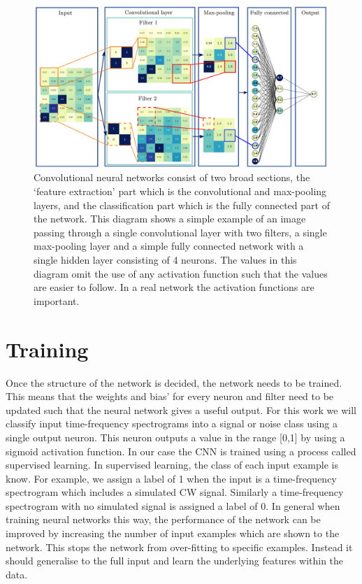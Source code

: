\begin{figure}
	\includegraphics[width=\textwidth]{C4_cnn/cnn_structure_ex.pdf}
	\caption[Structure of \glspl{CNN}.]{Convolutional neural networks consist of two broad sections, the `feature extraction' part which is the convolutional and max-pooling layers, and the classification part which is the fully connected part of the network. This diagram shows a simple example of an image passing through a single convolutional layer with two filters, a single max-pooling layer and a simple fully connected network with a single hidden layer consisting of 4 neurons. The values in this diagram omit the use of any activation function such that the values are easier to follow. In a real network the activation functions are important.}
	\label{machine:cnn:structure:example}
\end{figure}


\section{\label{machine:training}Training}

%
Once the structure of the network is decided, the network needs to be trained.
This means that the weights and bias' for every neuron and filter need to be updated such
that the neural network gives a useful output. For this
work we will classify input time-frequency spectrograms into a signal or noise class using a single output neuron.
This neuron outputs a value in the range [0,1] by using a sigmoid activation function.
In our case the \gls{CNN} is trained using a process called supervised learning. 
In supervised learning, the class of each input example is know. For example, we assign a label of 1 when the
input is a time-frequency spectrogram which includes a simulated \gls{CW}
signal. Similarly a time-frequency spectrogram with no simulated signal is assigned a label of 0. 
In general when training neural networks this way, the performance of the network can be improved by increasing the number of input examples which are shown to the network.
This stops the network from over-fitting to specific examples. Instead it should generalise to the full input and learn the underlying features within the data.

